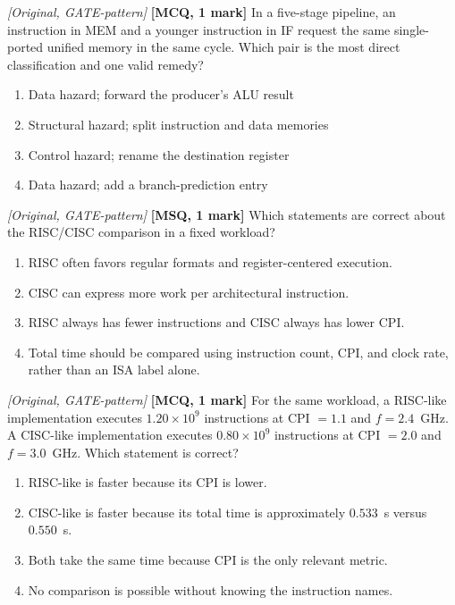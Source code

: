 \documentclass[11pt]{article}
\begin{document}
\begin{enumerate}
\item[\textbf{Q5}] \textit{[Original, GATE-pattern]} \textbf{[MCQ, 1 mark]}
In a five-stage pipeline, an instruction in MEM and a younger instruction in
IF request the same single-ported unified memory in the same cycle. Which pair
is the most direct classification and one valid remedy?
\begin{enumerate}
  \item[(A)] Data hazard; forward the producer's ALU result
  \item[(B)] Structural hazard; split instruction and data memories
  \item[(C)] Control hazard; rename the destination register
  \item[(D)] Data hazard; add a branch-prediction entry
\end{enumerate}

\begin{sloppypar}
\item[\textbf{Q6}] \textit{[Original, GATE-pattern]} \textbf{[MSQ, 1 mark]}
Which statements are correct about the RISC/CISC comparison in a fixed
workload?
\begin{enumerate}
  \item[(A)] RISC often favors regular formats and register-centered
    execution.
  \item[(B)] CISC can express more work per architectural instruction.
  \item[(C)] RISC always has fewer instructions and CISC always has lower CPI.
  \item[(D)] Total time should be compared using instruction count, CPI, and
    clock rate, rather than an ISA label alone.
\end{enumerate}
\end{sloppypar}

\item[\textbf{Q7}] \textit{[Original, GATE-pattern]} \textbf{[MCQ, 1 mark]}
For the same workload, a RISC-like implementation executes
$1.20\times10^9$ instructions at CPI $=1.1$ and $f=2.4$~GHz. A CISC-like
implementation executes $0.80\times10^9$ instructions at CPI $=2.0$ and
$f=3.0$~GHz. Which statement is correct?
\begin{enumerate}
  \item[(A)] RISC-like is faster because its CPI is lower.
  \item[(B)] CISC-like is faster because its total time is approximately
    $0.533$~s versus $0.550$~s.
  \item[(C)] Both take the same time because CPI is the only relevant metric.
  \item[(D)] No comparison is possible without knowing the instruction names.
\end{enumerate}


\end{enumerate}
\end{document}

